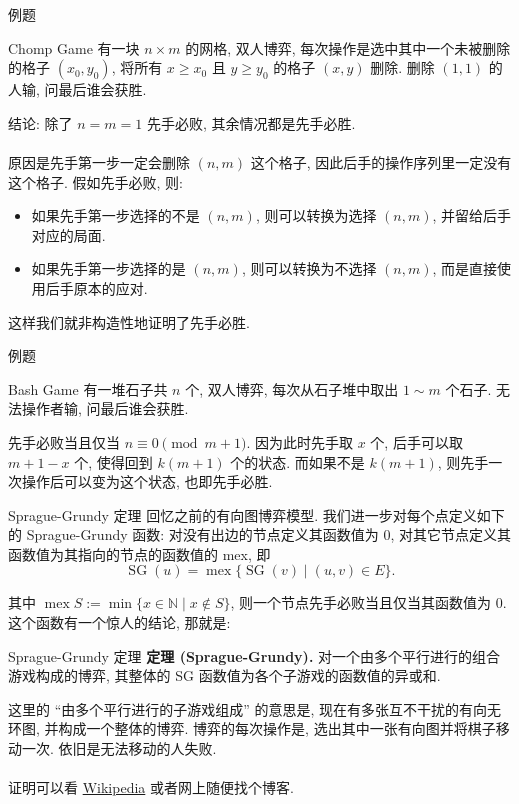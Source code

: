 \documentclass{beamer}
\newcommand{\nl}{\\\hspace*{\fill}\\}
\begin{document}
	\begin{frame}{例题}
		\begin{block}{Chomp Game}
			有一块 $n\times m$ 的网格, 双人博弈, 每次操作是选中其中一个未被删除的格子 $(x_0,y_0)$, 将所有 $x\geq x_0$ 且 $y\geq y_0$ 的格子 $(x,y)$ 删除. 删除 $(1,1)$ 的人输, 问最后谁会获胜.
		\end{block}
		\pause
		结论: 除了 $n=m=1$ 先手必败, 其余情况都是先手必胜.\nl
		原因是先手第一步一定会删除 $(n,m)$ 这个格子, 因此后手的操作序列里一定没有这个格子. 假如先手必败, 则:
		\begin{itemize}
			\item 如果先手第一步选择的不是 $(n,m)$, 则可以转换为选择 $(n,m)$, 并留给后手对应的局面.\\
			\item 如果先手第一步选择的是 $(n,m)$, 则可以转换为不选择 $(n,m)$, 而是直接使用后手原本的应对.\\
		\end{itemize}
		这样我们就非构造性地证明了先手必胜.
	\end{frame}

	\begin{frame}{例题}
		\begin{block}{Bash Game}
			有一堆石子共 $n$ 个, 双人博弈, 每次从石子堆中取出 $1\sim m$ 个石子. 无法操作者输, 问最后谁会获胜.
		\end{block}
		\pause
		先手必败当且仅当 $n\equiv 0\pmod{m+1}$. 因为此时先手取 $x$ 个, 后手可以取 $m+1-x$ 个, 使得回到 $k(m+1)$ 个的状态. 而如果不是 $k(m+1)$, 则先手一次操作后可以变为这个状态, 也即先手必胜.
	\end{frame}

	\begin{frame}{Sprague-Grundy 定理}
		回忆之前的有向图博弈模型. 我们进一步对每个点定义如下的 Sprague-Grundy 函数: 对没有出边的节点定义其函数值为 $0$, 对其它节点定义其函数值为其指向的节点的函数值的 mex, 即
		$$
		\operatorname{SG}(u)=\operatorname{mex}\{\operatorname{SG}(v)\mid (u,v)\in E\}.
		$$

		其中 $\operatorname{mex} S:=\min\{x\in\mathbb N\mid x\not\in S\}$, 则一个节点先手必败当且仅当其函数值为 $0$. 这个函数有一个惊人的结论, 那就是:
		\begin{block}{Sprague-Grundy 定理}
			\textbf{定理 (Sprague-Grundy).} 对一个由多个平行进行的组合游戏构成的博弈, 其整体的 SG 函数值为各个子游戏的函数值的异或和.
		\end{block}
		这里的 ``由多个平行进行的子游戏组成'' 的意思是, 现在有多张互不干扰的有向无环图, 并构成一个整体的博弈. 博弈的每次操作是, 选出其中一张有向图并将棋子移动一次. 依旧是无法移动的人失败.\nl
		证明可以看 \href{https://en.wikipedia.org/wiki/Sprague-Grundy_theorem}{Wikipedia} 或者网上随便找个博客.
	\end{frame}
\end{document}
